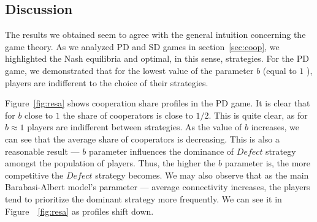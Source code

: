 \documentclass[english, twoside, 12pt, a4paper]{article}
\theoremstyle{definition}
\theoremstyle{plain}
\theoremstyle{remark}
\begin{document}
\subsection{Discussion}

The results we obtained seem to agree with the general intuition concerning the game theory. As we analyzed PD and SD games in section~\ref{sec:coop}, we highlighted the Nash equilibria and optimal, in this sense, strategies. For the PD game, we demonstrated that for the lowest value of the parameter $b$ (equal to \( 1\) ), players are indifferent to the choice of their strategies. 


Figure~\ref{fig:resa} shows cooperation share profiles in the PD game. It is clear that for \(b\) close to \(1\) the share of cooperators is close to \(1/2\). This is quite clear, as for \(b \approx 1\) players are indifferent between strategies. As the value of $b$ increases, we can see that the average share of cooperators is decreasing. This is also a reasonable result --- $b$ parameter influences the dominance of $Defect$ strategy amongst the population of players. Thus, the higher the $b$ parameter is, the more competitive the $Defect$ strategy becomes. We may also observe that as the main Barabasi-Albert model's parameter --- average connectivity increases, the players tend to prioritize the dominant strategy more frequently. We can see it in Figure~~\ref{fig:resa} as profiles shift down. 
\end{document}
